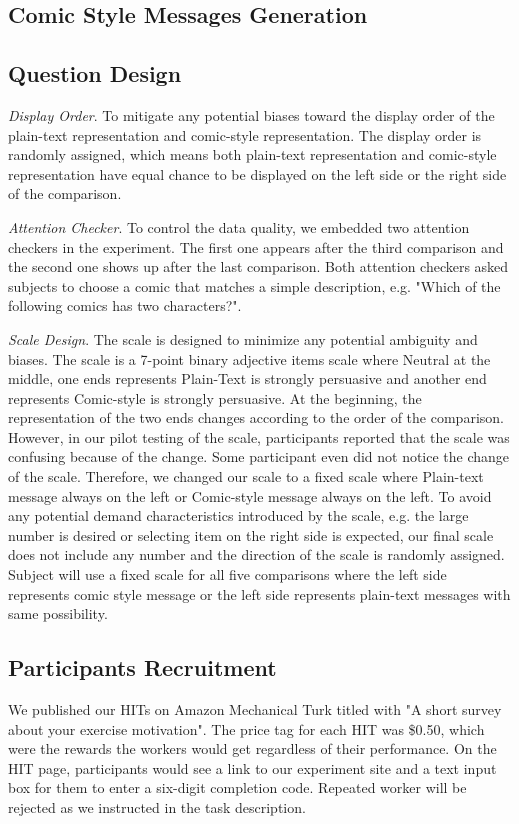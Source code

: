 \subsection{Comic Style Messages Generation}
\subsection{Question Design}
\textit{Display Order}. To mitigate any potential biases toward the display order of the plain-text representation and comic-style representation. The display order is randomly assigned, which means both plain-text representation and comic-style representation have equal chance to be displayed on the left side or the right side of the comparison.\par
\textit{Attention Checker}. To control the data quality, we embedded two attention checkers in the experiment. The first one appears after the third comparison and the second one shows up after the last comparison. Both attention checkers asked subjects to choose a comic that matches a simple description, e.g. "Which of the following comics has two characters?".\par
\textit{Scale Design}.  The scale is designed to minimize any potential ambiguity and biases. The scale is a 7-point binary adjective items scale where Neutral at the middle, one ends represents Plain-Text is strongly persuasive and another end represents Comic-style is strongly persuasive. At the beginning, the representation of the two ends changes according to the order of the comparison. However, in our pilot testing of the scale, participants reported that the scale was confusing because of the change. Some participant even did not notice the change of the scale. Therefore, we changed our scale to a fixed scale where Plain-text message always on the left or Comic-style message always on the left. To avoid any potential demand characteristics introduced by the scale, e.g. the large number is desired or selecting item on the right side is expected, our final scale does not include any number and the direction of the scale is randomly assigned. Subject will use a fixed scale for all five comparisons where the left side represents comic style message or the left side represents plain-text messages with same possibility.\par

\subsection{Participants Recruitment}
We published our HITs on Amazon Mechanical Turk titled with "A short survey about your exercise motivation". The price tag for each HIT was \$0.50, which were the rewards the workers would get regardless of their performance. On the HIT page, participants would see a link to our experiment site and a text input box for them to enter a six-digit completion code. Repeated worker will be rejected as we instructed in the task description.
